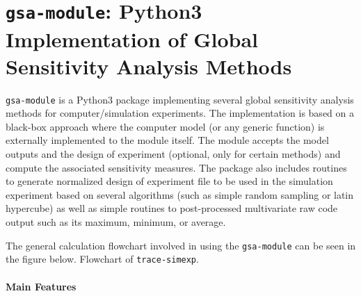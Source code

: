 \section[\texttt{gsa-module}]{\texttt{gsa-module}: Python3 Implementation of Global Sensitivity Analysis Methods}\label{app:gsa_module}

\texttt{gsa-module} is a Python3 package implementing several global sensitivity analysis methods for computer/simulation experiments.
The implementation is based on a black-box approach where the computer model (or any generic function) is externally implemented to the module itself.
The module accepts the model outputs and the design of experiment (optional, only for certain methods) and compute the associated sensitivity measures.
The package also includes routines to generate normalized design of experiment file to be used in the simulation experiment based on several algorithms (such as simple random sampling or latin hypercube) as well as simple routines to post-processed multivariate raw code output such as its maximum, minimum, or average.

The general calculation flowchart involved in using the \texttt{gsa-module} can be seen in the figure below.
{Flowchart of \texttt{trace-simexp}.}

\paragraph{Main Features}

